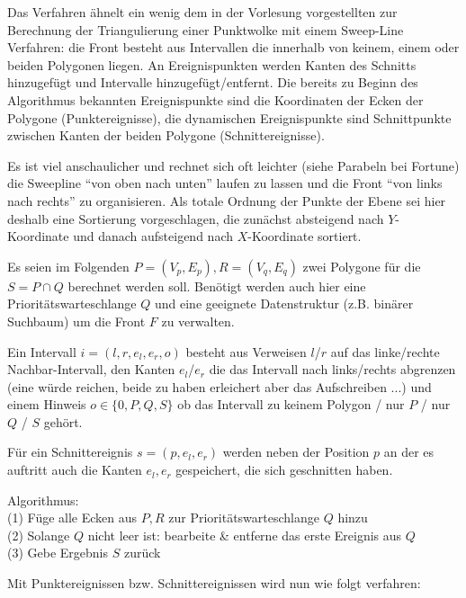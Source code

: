 Das Verfahren ähnelt ein wenig dem in der Vorlesung vorgestellten zur Berechnung der Triangulierung einer Punktwolke mit einem Sweep-Line Verfahren: die Front besteht aus Intervallen die innerhalb von keinem, einem oder beiden Polygonen liegen. An Ereignispunkten werden Kanten des Schnitts hinzugefügt und Intervalle hinzugefügt/entfernt. Die bereits zu Beginn des Algorithmus bekannten Ereignispunkte sind die Koordinaten der Ecken der Polygone (Punktereignisse), die dynamischen Ereignispunkte sind Schnittpunkte zwischen Kanten der beiden Polygone (Schnittereignisse).

Es ist viel anschaulicher und rechnet sich oft leichter (siehe Parabeln bei Fortune) die Sweepline "`von oben nach unten"' laufen zu lassen und die Front "`von links nach rechts"' zu organisieren. Als totale Ordnung der Punkte der Ebene sei hier deshalb eine Sortierung vorgeschlagen, die zunächst absteigend nach $Y$-Koordinate und danach aufsteigend nach $X$-Koordinate sortiert.

Es seien im Folgenden $P=(V_p,E_p),R=(V_q,E_q)$ zwei Polygone für die $S=P\cap Q$ berechnet werden soll. Benötigt werden auch hier eine Prioritätswarteschlange $Q$ und eine geeignete Datenstruktur (z.B. binärer Suchbaum) um die Front $F$ zu verwalten.

Ein Intervall $i=(l,r,e_l,e_r,o)$ besteht aus Verweisen $l$/$r$ auf das linke/rechte Nachbar-Intervall, den Kanten $e_l$/$e_r$ die das Intervall nach links/rechts abgrenzen (eine würde reichen, beide zu haben erleichert aber das Aufschreiben ...) und einem Hinweis $o\in\{ 0,P,Q,S\}$ ob das Intervall zu keinem Polygon / nur $P$ / nur $Q$ / $S$ gehört.

Für ein Schnittereignis $s=(p,e_l,e_r)$ werden neben der Position $p$ an der es auftritt auch die Kanten $e_l,e_r$ gespeichert, die sich geschnitten haben.

Algorithmus:\\
(1) Füge alle Ecken aus $P,R$ zur Prioritätswarteschlange $Q$ hinzu\\
(2) Solange $Q$ nicht leer ist: bearbeite \& entferne das erste Ereignis aus $Q$\\
(3) Gebe Ergebnis $S$ zurück

Mit Punktereignissen bzw. Schnittereignissen wird nun wie folgt verfahren:

